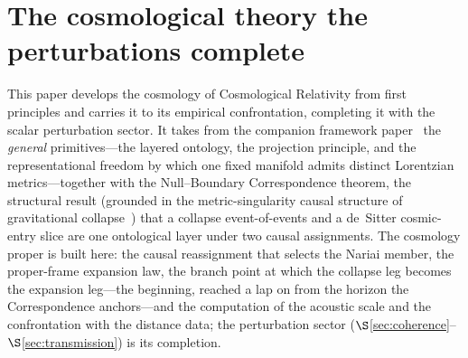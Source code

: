 \documentclass[11pt,a4paper]{article}
\theoremstyle{plain}
\theoremstyle{definition}
\theoremstyle{remark}
\begin{document}
\section{The cosmological theory the perturbations complete}\label{sec:background}

This paper develops the cosmology of Cosmological Relativity from first principles and carries it to its empirical confrontation, completing it with the scalar perturbation sector. It takes from the companion framework paper~\cite{JanzenCRframework} the \emph{general} primitives---the layered ontology, the projection principle, and the representational freedom by which one fixed manifold admits distinct Lorentzian metrics---together with the Null--Boundary Correspondence theorem, the structural result (grounded in the metric-singularity causal structure of gravitational collapse~\cite{JanzenBHcausality}) that a collapse event-of-events and a de~Sitter cosmic-entry slice are one ontological layer under two causal assignments. The cosmology proper is built here: the causal reassignment that selects the Nariai member, the proper-frame expansion law, the branch point at which the collapse leg becomes the expansion leg---the beginning, reached a lap on from the horizon the Correspondence anchors---and the computation of the acoustic scale and the confrontation with the distance data; the perturbation sector ($\S$\ref{sec:coherence}--$\S$\ref{sec:transmission}) is its completion.
\end{document}

